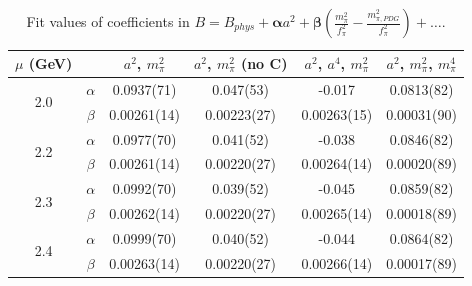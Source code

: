 \documentclass[12pt]{extarticle}
\begin{document}
\begin{table}[h!]
\begin{center}
\begin{tabular}{|c c|c|c|c|c|}
\hline
$\mu$ (GeV) &  & $a^2$, $m_\pi^2$& $a^2$, $m_\pi^2$ (no C)& $a^2$, $a^4$, $m_\pi^2$& $a^2$, $m_\pi^2$, $m_\pi^4$\\
\hline
\multirow{2}{0.5in}{2.0} & $\alpha$ & 0.0937(71)& 0.047(53)& -0.017& 0.0813(82)\\
 & $\beta$ & 0.00261(14)& 0.00223(27)& 0.00263(15)& 0.00031(90)\\
\hline
\multirow{2}{0.5in}{2.2} & $\alpha$ & 0.0977(70)& 0.041(52)& -0.038& 0.0846(82)\\
 & $\beta$ & 0.00261(14)& 0.00220(27)& 0.00264(14)& 0.00020(89)\\
\hline
\multirow{2}{0.5in}{2.3} & $\alpha$ & 0.0992(70)& 0.039(52)& -0.045& 0.0859(82)\\
 & $\beta$ & 0.00262(14)& 0.00220(27)& 0.00265(14)& 0.00018(89)\\
\hline
\multirow{2}{0.5in}{2.4} & $\alpha$ & 0.0999(70)& 0.040(52)& -0.044& 0.0864(82)\\
 & $\beta$ & 0.00263(14)& 0.00220(27)& 0.00266(14)& 0.00017(89)\\
\hline
\end{tabular}
\caption{Fit values of coefficients in $B = B_{phys} + \mathbf{\alpha} a^2 + \mathbf{\beta}\left(\frac{m_\pi^2}{f_\pi^2}-\frac{m_{\pi,PDG}^2}{f_\pi^2}\right) + \ldots$.}
\end{center}
\end{table}
















\clearpage
\end{document}
